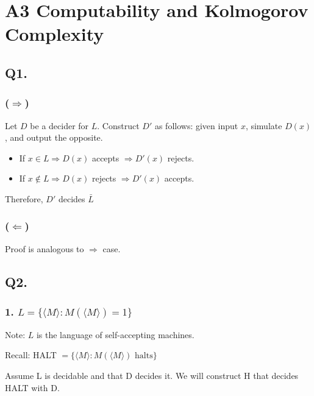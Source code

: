 \documentclass[letterpaper]{article}
\begin{document}
\flushleft
\renewcommand{\labelitemiii}{\(\smallblackcircle\)}
\renewcommand{\labelitemii}{\(\smallblackcircle\)}

\lstset{
  basicstyle=\ttfamily,
  mathescape
}

\section*{A3 Computability and Kolmogorov Complexity}

\subsection*{Q1.}

\subsubsection*{($\Rightarrow$)}

Let $D$ be a decider for $L$.
Construct $D'$ as follows: given input $x$, simulate $D(x)$,
and output the opposite.

\begin{itemize}
  \item If $x \in L \Rightarrow D(x)$ accepts $\Rightarrow D'(x)$ rejects.
  \item If $x \notin L \Rightarrow D(x)$ rejects $\Rightarrow D'(x)$ accepts.
\end{itemize}

Therefore, $D'$ decides $\bar{L}$

\subsubsection*{($\Leftarrow$)}

Proof is analogous to $\Rightarrow$ case.

\subsection*{Q2.}

\subsubsection*{1. $L=\{\langle M\rangle: M(\langle M \rangle) = 1\}$}

Note: $L$ is the language of self-accepting machines.

Recall: HALT $= \{\langle M \rangle: M(\langle M \rangle) \text{ halts}\}$

Assume L is decidable and that D decides it. We will construct H
that decides HALT with D.
\end{document}
